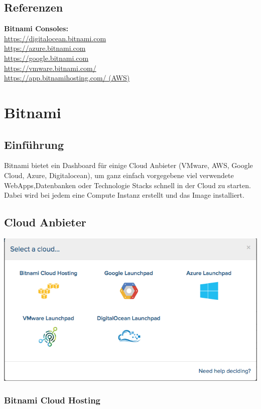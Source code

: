 \documentclass[11pt]{scrartcl}
\begin{document}
\subsection{Referenzen}
\textbf{Bitnami Consoles:}\\
\href{https://digitalocean.bitnami.com}{https://digitalocean.bitnami.com}\\
\href{https://azure.bitnami.com}{https://azure.bitnami.com}\\
\href{https://google.bitnami.com}{https://google.bitnami.com}\\
\href{https://vmware.bitnami.com/}{https://vmware.bitnami.com/}\\
\href{https://app.bitnamihosting.com/}{https://app.bitnamihosting.com/ (AWS)}\\

\section{Bitnami}
\subsection{Einführung}
Bitnami bietet ein Dashboard für einige Cloud Anbieter (VMware, AWS, Google Cloud, Azure, 
Digitalocean), um ganz einfach vorgegebene viel verwendete WebApps,Datenbanken oder Technologie Stacks 
schnell in der Cloud zu starten.
Dabei wird bei jedem eine Compute Instanz erstellt und das Image installiert.

\subsection{Cloud Anbieter}
\includegraphics[width=\textwidth]{clouds}
\subsubsection{Bitnami Cloud Hosting}
\end{document}

